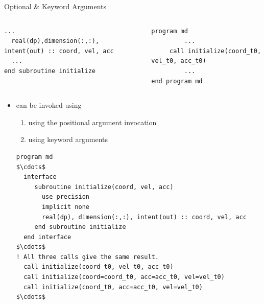 \documentclass[10pt,t]{beamer}
\begin{document}
\begin{frame}{Optional \& Keyword Arguments}
\begin{columns}
\begin{lstlisting}[language={[90]Fortran},basicstyle=\fontsize{5}{6}\selectfont\ttfamily]
  ...
  real(dp),dimension(:,:), intent(out) :: coord, vel, acc
  ...
end subroutine initialize
    \end{lstlisting}
    \column{5.5cm}
    \begin{lstlisting}[language={[90]Fortran},basicstyle=\fontsize{5}{6}\selectfont\ttfamily]
program md
         ...
     call initialize(coord_t0, vel_t0, acc_t0)
         ...
end program md
    \end{lstlisting}
  \end{columns}
  \framebreak
  \begin{itemize}
    \item {} can be invoked using 
    \begin{enumerate}
      \item using the positional argument invocation
      \item using keyword arguments
    \end{enumerate}
    \begin{lstlisting}[language={[90]Fortran},basicstyle=\fontsize{7}{8}\selectfont\ttfamily,mathescape]
program md
$\cdots$
  interface
     subroutine initialize(coord, vel, acc)
       use precision
       implicit none
       real(dp), dimension(:,:), intent(out) :: coord, vel, acc
     end subroutine initialize
  end interface
$\cdots$
! All three calls give the same result.
  call initialize(coord_t0, vel_t0, acc_t0)
  call initialize(coord=coord_t0, acc=acc_t0, vel=vel_t0)
  call initialize(coord_t0, acc=acc_t0, vel=vel_t0)
$\cdots$
    \end{lstlisting}
  \end{itemize}
\end{frame}
\end{document}

